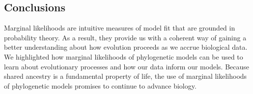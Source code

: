 \subsection{Conclusions}

Marginal likelihoods are intuitive measures of model fit that are grounded in
probability theory.
As a result, they provide us with a coherent way of gaining a better
understanding about how evolution proceeds as we accrue biological data.
We highlighted how marginal likelihoods of phylogenetic models can be used to
learn about evolutionary processes and how our data inform our models.
Because shared ancestry is a fundamental property of life, the use of marginal
likelihoods of phylogenetic models promises to continue to advance biology.
